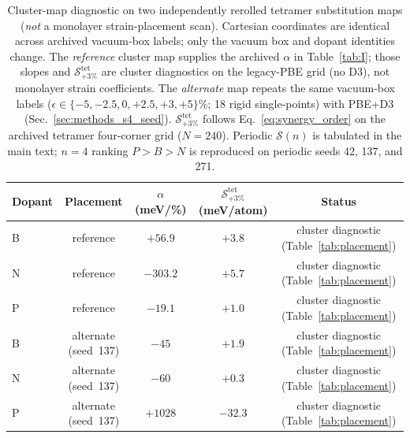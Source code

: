 \begin{table}[!ht]
\caption{\label{tab:sgrid}Cluster-map diagnostic on two independently rerolled tetramer substitution maps (\emph{not} a monolayer strain-placement scan). Cartesian coordinates are identical across archived vacuum-box labels; only the vacuum box and dopant identities change.
The \emph{reference} cluster map supplies the archived $\alpha$ in Table~\ref{tab:I}; those slopes and $\mathcal{S}_{+3\%}^{\mathrm{tet}}$ are cluster diagnostics on the legacy-PBE grid (no D3), not monolayer strain coefficients.
The \emph{alternate} map repeats the same vacuum-box labels ($\epsilon\in\{-5,-2.5,0,+2.5,+3,+5\}$\%; 18 rigid single-points) with PBE+D3 (Sec.~\ref{sec:methods_s4_seed}).
$\mathcal{S}_{+3\%}^{\mathrm{tet}}$ follows Eq.~\eqref{eq:synergy_order} on the archived tetramer four-corner grid ($N{=}240$).
Periodic $\mathcal{S}(n)$ is tabulated in the main text; $n{=}4$ ranking $P{>}B{>}N$ is reproduced on periodic seeds 42, 137, and 271.}
\begin{ruledtabular}
\begin{tabular}{lcccc}
Dopant & Placement & $\alpha$ (meV/\%) & $\mathcal{S}_{+3\%}^{\mathrm{tet}}$ (meV/atom) & Status \\
\hline
B & reference & $+56.9$ & $+3.8$ & cluster diagnostic (Table~\ref{tab:placement}) \\
N & reference & $-303.2$ & $+5.7$ & cluster diagnostic (Table~\ref{tab:placement}) \\
P & reference & $-19.1$ & $+1.0$ & cluster diagnostic (Table~\ref{tab:placement}) \\
B & alternate (seed~137) & $-45$ & $+1.9$ & cluster diagnostic (Table~\ref{tab:placement}) \\
N & alternate (seed~137) & $-60$ & $+0.3$ & cluster diagnostic (Table~\ref{tab:placement}) \\
P & alternate (seed~137) & $+1028$ & $-32.3$ & cluster diagnostic (Table~\ref{tab:placement}) \\
\end{tabular}
\end{ruledtabular}
\end{table}

